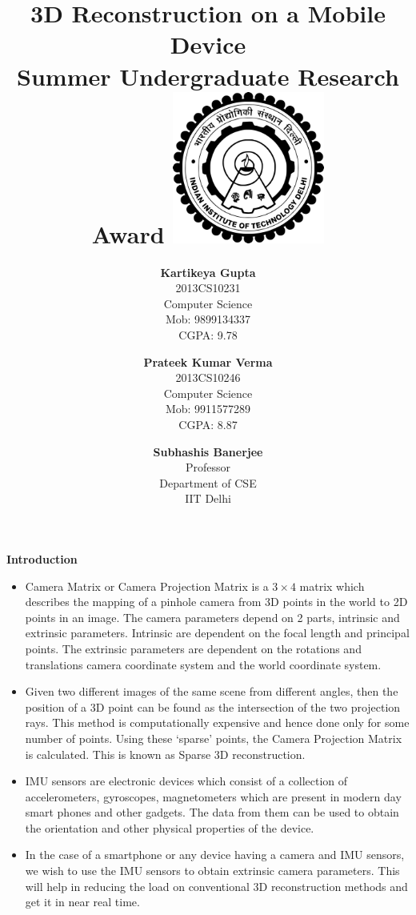 \documentclass{article}
\title{\vspace*{\fill} \textbf{3D Reconstruction on a Mobile Device}
	  \\ {\large \textbf{Summer Undergraduate Research Award}}
	  \includegraphics[width=5cm]{logo.png}}
\author{
	\textbf{Kartikeya Gupta}\\ 
	2013CS10231\\
	Computer Science\\
	Mob: 9899134337\\
	CGPA: 9.78
	\and
	\textbf{Prateek Kumar Verma}\\ 
	2013CS10246\\
	Computer Science\\
	Mob: 9911577289\\
	CGPA: 8.87
}
\date{\textbf{Subhashis Banerjee} \\ Professor \\ Department of CSE \\ IIT Delhi \vspace*{\fill}}
\begin{document}
	\maketitle

	\newpage

	\textbf{\Large Introduction \\}
		\begin{itemize}
		
			\item 
				Camera Matrix or Camera Projection Matrix is a $3 \times 4$ matrix which describes the mapping of a pinhole camera from 3D points in the world to 2D points in an image. The camera parameters depend on 2 parts, intrinsic and extrinsic parameters. Intrinsic are dependent on the focal length and principal points. The extrinsic parameters are dependent on the rotations and translations camera coordinate system and the world coordinate system.
			
			\item 
				Given two different images of the same scene from different angles, then the position of a 3D point can be found as the intersection of the two projection rays. This method is computationally expensive and hence done only for some number of points. Using these `sparse' points, the Camera Projection Matrix is calculated. This is known as Sparse 3D reconstruction.

			\item
				IMU sensors are electronic devices which consist of a collection of accelerometers, gyroscopes, magnetometers which are present in modern day smart phones and other gadgets. The data from them can be used to obtain the orientation and other physical properties of the device.

			\item 
				In the case of a smartphone or any device having a camera and IMU sensors, we wish to use  the IMU sensors to obtain extrinsic camera parameters. This will help in reducing the load on conventional 3D reconstruction methods and get it in near real time.
		\end{itemize}
\end{document}
